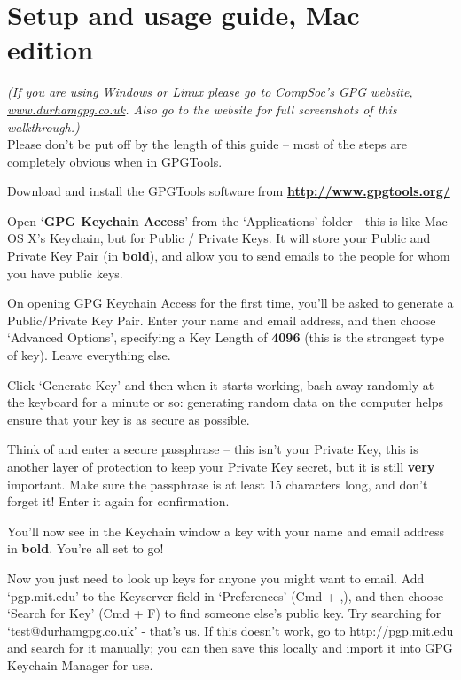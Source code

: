 \section{Setup and usage guide, Mac edition}
\textit{(If you are using Windows or Linux please go to CompSoc's GPG website, \href{http://www.durhamgpg.co.uk}{www.durhamgpg.co.uk}. Also go to the website for full screenshots of this walkthrough.)} \\
Please don't be put off by the length of this guide -- most of the steps are completely obvious when in GPGTools.
\begin{compactenum}[1.]%
  \item Download and install the GPGTools software from \textbf{\href{http://www.gpgtools.org/}{http://www.gpgtools.org/}}
  \item Open `\textbf{GPG Keychain Access}' from the `Applications' folder - this is like Mac OS X's Keychain, but for Public / Private Keys. It will store your Public and Private Key Pair (in \textbf{bold}), and allow you to send emails to the people for whom you have public keys.
  \item On opening GPG Keychain Access for the first time, you'll be asked to generate a Public/Private Key Pair. Enter your name and email address, and then choose `Advanced Options', specifying a Key Length of \textbf{4096} (this is the strongest type of key). Leave everything else.
  \item Click `Generate Key' and then when it starts working, bash away randomly at the keyboard for a minute or so: generating random data on the computer helps ensure that your key is as secure as possible.
  \item Think of and enter a secure passphrase -- this isn't your Private Key, this is another layer of protection to keep your Private Key secret, but it is still \textbf{very} important. Make sure the passphrase is at least 15 characters long, and don't forget it! Enter it again for confirmation.
  \item You'll now see in the Keychain window a key with your name and email address in \textbf{bold}. You're all set to go! 
  \item Now you just need to look up keys for anyone you might want to email. Add `pgp.mit.edu' to the Keyserver field in `Preferences' (Cmd + ,), and then choose `Search for Key' (Cmd + F) to find someone else's public key. Try searching for `test@durhamgpg.co.uk' - that's us. If this doesn't work, go to \href{http://pgp.mit.edu}{http://pgp.mit.edu} and search for it manually; you can then save this locally and import it into GPG Keychain Manager for use.

\end{compactenum}
